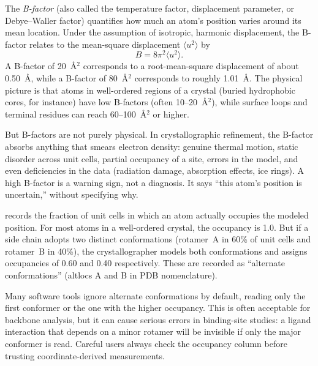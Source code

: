 The \emph{B-factor} (also called the temperature factor, displacement
parameter, or Debye--Waller factor) quantifies how much an atom's
position varies around its mean location. Under the assumption of
isotropic, harmonic displacement, the B-factor relates to the
mean-square displacement $\langle u^2 \rangle$ by
\begin{equation}
\label{eq:bfactor-isotropic}
  B = 8\pi^2 \langle u^2 \rangle.
\end{equation}
A B-factor of 20~{\AA}$^2$ corresponds to a root-mean-square
displacement of about 0.50~{\AA}, while a B-factor of 80~{\AA}$^2$
corresponds to roughly 1.01~{\AA}.
The physical picture is that atoms in well-ordered regions of a
crystal (buried hydrophobic cores, for instance) have low
B-factors (often 10--20~{\AA}$^2$), while surface loops and
terminal residues can reach 60--100~{\AA}$^2$ or higher.

But B-factors are not purely physical. In crystallographic refinement,
the B-factor absorbs anything that smears electron density: genuine
thermal motion, static disorder across unit cells, partial occupancy
of a site, errors in the model, and even deficiencies in the data
(radiation damage, absorption effects, ice rings). A high B-factor
is a warning sign, not a diagnosis. It says ``this atom's position
is uncertain,'' without specifying why.

 records the fraction of unit cells in which
an atom actually occupies the modeled position. For most atoms in
a well-ordered crystal, the occupancy is 1.0. But if a side chain
adopts two distinct conformations (rotamer~A in 60\% of unit cells
and rotamer~B in 40\%), the crystallographer models both conformations
and assigns occupancies of 0.60 and 0.40 respectively. These are
recorded as ``alternate conformations'' (altlocs A and B in PDB
nomenclature).

Many software tools ignore alternate conformations by default, reading
only the first conformer or the one with the higher occupancy. This
is often acceptable for backbone analysis, but it can cause serious
errors in binding-site studies: a ligand interaction that depends on
a minor rotamer will be invisible if only the major conformer is read.
Careful users always check the occupancy column before trusting
coordinate-derived measurements.


